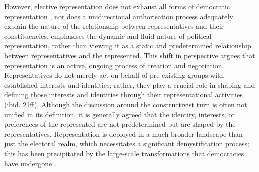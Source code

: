 %
%
%

However, elective representation does not exhaust all forms of democratic representation \parencite{saward2009}, nor does a unidirectional authorisation process adequately explain the nature of the relationship between representatives and their constituencies.  \parencite{disch2019} emphasises the dynamic and fluid nature of political representation, rather than viewing it as a static and predetermined relationship between representatives and the represented. This shift in perspective argues that representation is an active, ongoing process of creation and negotiation. Representatives do not merely act on behalf of pre-existing groups with established interests and identities; rather, they play a crucial role in shaping and defining those interests and identities through their representational activities (ibid. 21ff). Although the discussion around the constructivist turn is often not unified in its definition, it is generally agreed that the identity, interests, or preferences of the represented are not predetermined but are shaped by the representatives. Representation is deployed in a much broader landscape than just the electoral realm, which necessitates a significant demystification process; this has been precipitated by the large-scale transformations that democracies have undergone \parencite[278f]{wolkenstein2024}.

